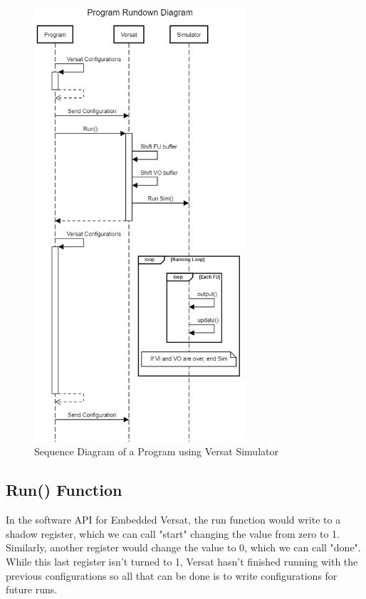 \newpage
\begin{figure}[!htbp]
    \centering
    \includegraphics[width=0.7\textwidth]{Figures/versatsim.png}
    \caption{Sequence Diagram of a Program using Versat Simulator}
    \label{figure:VersatSimulatorSequenceDiagram}
\end{figure} 



\subsection{Run() Function}

In the software API for Embedded Versat, the run function would write to a shadow register,
which we can call "start" changing the value from zero to 1. 
Similarly, another register would
change the value to 0, which we can call "done". While this last register isn't turned to 1, 
Versat hasn't finished running with the 
previous configurations so all that can be done is to write
configurations for future runs.

